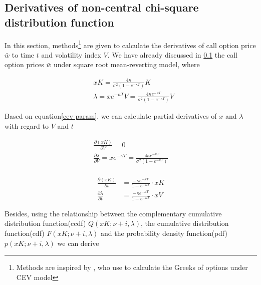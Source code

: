 \subsection{Derivatives of non-central chi-square distribution function}
\label{sec: 3.2}

In this section, methods\footnote{Methods are inspired by \cite{hossain_comparison_2019}, who use to calculate the Greeks of options under CEV model} are given to calculate the derivatives of call option price $\bar{w}$ to time $t$ and volatility index $V$. We have already discussed in \ref{sec: 3.2} the call option prices $\bar{w}$ under square root mean-reverting model, where

\begin{equation}\label{cev param}
    \begin{aligned}
        &x K=\frac{4 \kappa}{\sigma^{2}(1-e^{-\kappa T})} K\\
        &\lambda=x e^{-\kappa T} V = \frac{4 \kappa e^{-\kappa T}}{\sigma^{2}(1-e^{-\kappa T})} V
        \end{aligned}
\end{equation}

Based on equation\eqref{cev param}, we can calculate partial derivatives of $x$ and $\lambda$ with regard to $V$ and $t$

\begin{equation}\label{params dv}
    \begin{gathered}
        \frac{\partial (x K)}{\partial V}=0\\
        \frac{\partial \lambda}{\partial V}=x e^{-\kappa T}  = \frac{4 \kappa e^{-\kappa T}}{\sigma^{2}(1-e^{-\kappa T})}\\
    \end{gathered}
\end{equation}

\begin{equation}\label{params dt}
    \begin{aligned}
        \frac{\partial (x K)}{\partial t}&= \frac{-\kappa e^{-\kappa T}}{1 - e^{-\kappa T}} \cdot  xK\\
        \frac{\partial \lambda}{\partial t}& =\frac{-\kappa e^{-\kappa T}}{1 - e^{-\kappa T}} \cdot  xV
    \end{aligned}
\end{equation}

Besides, using the relationship between the complementary cumulative distribution function(ccdf) $Q(xK; \nu+i, \lambda)$, the cumulative distribution function(cdf) $F(xK; \nu+i, \lambda)$ and the probability density function(pdf) $p(xK; \nu+i, \lambda)$ we can derive

